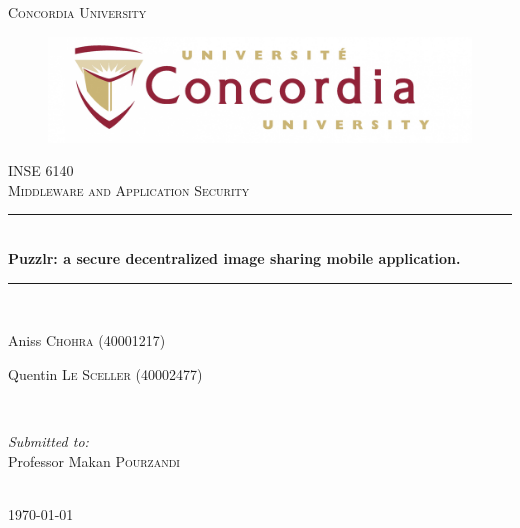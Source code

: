 \begin{titlepage}
 \newcommand{\HRule}{\rule{\linewidth}{0.5mm}}
 \center
 
 
 \textsc{\LARGE Concordia University}\\[1.5cm]
 \begin{figure}[h]
 \centering
 \includegraphics[width=12cm]{images/cover/concordia}
 \end{figure}

 \textsc{\large INSE 6140}\\[0.5cm]
 \textsc{\large Middleware and Application Security}
 
 
 \HRule \\[0.4cm]
 {
  \Huge \bfseries Puzzlr: a secure decentralized image sharing mobile application.
 }
 \HRule \\[1.5cm]
 
 
 \begin{minipage}{1\textwidth}
  \begin{flushleft}
   \center Aniss \textsc{Chohra} (40001217)
  \end{flushleft}
  \begin{flushleft}
   \center Quentin \textsc{Le Sceller} (40002477)
  \end{flushleft}


 \end{minipage}
 ~
 \newline
 \newline
 
 
 \begin{minipage}{1\textwidth}
 
  \begin{flushleft}
   \emph{Submitted to:} \\
   Professor Makan \textsc{Pourzandi}
  \end{flushleft}

 \end{minipage}\\[4cm]
 
 
 {\large \today}\\[3cm]
 
 \vfill


\end{titlepage}
